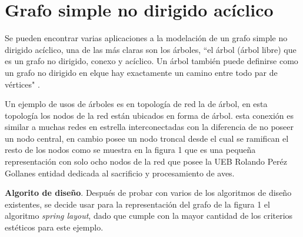 \documentclass{article}
\begin{document}
\section{ Grafo simple no dirigido acíclico}
Se pueden encontrar varias aplicaciones a la modelación de un grafo simple no dirigido acíclico, una de las más claras son los árboles, “el árbol (árbol libre) que es un grafo no dirigido, conexo y acíclico. Un árbol también puede definirse como un grafo no dirigido en elque hay exactamente un camino entre todo par de vértices" \cite{gf1}. 

Un ejemplo de usos de árboles es en topología de red la de árbol, en esta topología los nodos de la red están ubicados en forma de árbol. esta conexión es similar a muchas redes en estrella interconectadas con la diferencia de no poseer un nodo central, en cambio posee un nodo troncal desde el cual se ramifican el resto de los nodos como se muestra en la figura 1 que es una pequeña representación con solo ocho nodos de la red que posee la UEB Rolando Peréz Gollanes entidad dedicada al sacrificio y procesamiento de aves. 

\textbf{Algorito de diseño}.
Después de probar con varios de los algoritmos de diseño existentes, se decide usar para la representación del grafo de la figura 1 el algoritmo \textit{spring layout}, dado que cumple con la mayor cantidad de los criterios estéticos para este ejemplo.

 
 
\end{document}
